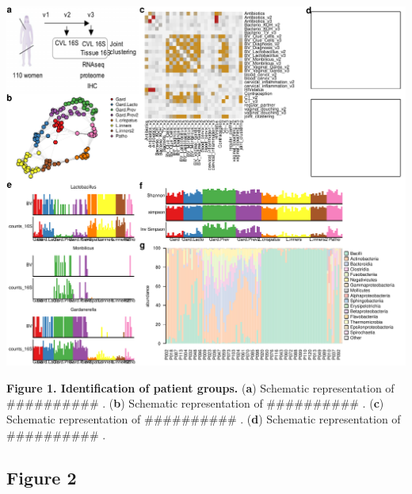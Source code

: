 \documentclass[
]{article}
\begin{document}
\includegraphics[width=1\linewidth]{manuscript_template_files/figure-latex/unnamed-chunk-5-1}

\textbf{Figure 1. Identification of patient groups.}
(\textbf{a}) Schematic representation of \#\#\#\#\#\#\#\#\#\# .
(\textbf{b}) Schematic representation of \#\#\#\#\#\#\#\#\#\# .
(\textbf{c}) Schematic representation of \#\#\#\#\#\#\#\#\#\# .
(\textbf{d}) Schematic representation of \#\#\#\#\#\#\#\#\#\# .

\clearpage

\hypertarget{figure-2}{%
\subsection{Figure 2}\label{figure-2}}
\end{document}
